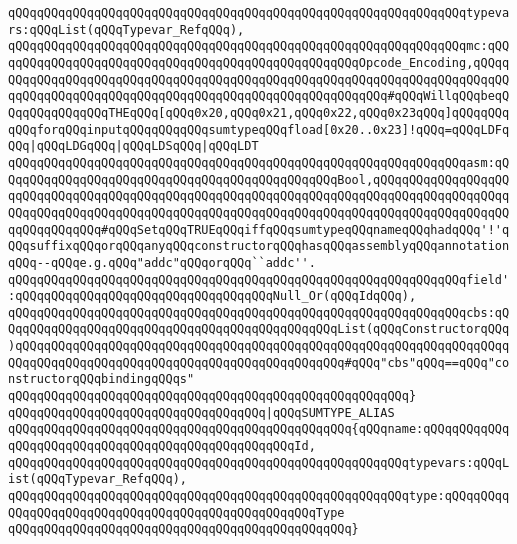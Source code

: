 \verb|qQQqqQQqqQQqqQQqqQQqqQQqqQQqqQQqqQQqqQQqqQQqqQQqqQQqqQQqqQQqqQQqtypevars:qQQqList(qQQqTypevar_RefqQQq),|\newline
\verb|qQQqqQQqqQQqqQQqqQQqqQQqqQQqqQQqqQQqqQQqqQQqqQQqqQQqqQQqqQQqqQQqmc:qQQqqQQqqQQqqQQqqQQqqQQqqQQqqQQqqQQqqQQqqQQqqQQqqQQqOpcode_Encoding,qQQqqQQqqQQqqQQqqQQqqQQqqQQqqQQqqQQqqQQqqQQqqQQqqQQqqQQqqQQqqQQqqQQqqQQqqQQqqQQqqQQqqQQqqQQqqQQqqQQqqQQqqQQqqQQqqQQqqQQqqQQqqQQq#qQQqWillqQQqbeqQQqqQQqqQQqqQQqTHEqQQq[qQQq0x20,qQQq0x21,qQQq0x22,qQQq0x23qQQq]qQQqqQQqqQQqforqQQqinputqQQqqQQqqQQqsumtypeqQQqfload[0x20..0x23]!qQQq=qQQqLDFqQQq|\verb#|qQQqLDGqQQq|qQQqLDSqQQq|qQQqLDT#\newline
\verb|qQQqqQQqqQQqqQQqqQQqqQQqqQQqqQQqqQQqqQQqqQQqqQQqqQQqqQQqqQQqqQQqasm:qQQqqQQqqQQqqQQqqQQqqQQqqQQqqQQqqQQqqQQqqQQqqQQqBool,qQQqqQQqqQQqqQQqqQQqqQQqqQQqqQQqqQQqqQQqqQQqqQQqqQQqqQQqqQQqqQQqqQQqqQQqqQQqqQQqqQQqqQQqqQQqqQQqqQQqqQQqqQQqqQQqqQQqqQQqqQQqqQQqqQQqqQQqqQQqqQQqqQQqqQQqqQQqqQQqqQQqqQQqqQQq#qQQqSetqQQqTRUEqQQqiffqQQqsumtypeqQQqnameqQQqhadqQQq'!'qQQqsuffixqQQqorqQQqanyqQQqconstructorqQQqhasqQQqassemblyqQQqannotationqQQq--qQQqe.g.qQQq"addc"qQQqorqQQq``addc''.|\newline
\verb|qQQqqQQqqQQqqQQqqQQqqQQqqQQqqQQqqQQqqQQqqQQqqQQqqQQqqQQqqQQqqQQqfield':qQQqqQQqqQQqqQQqqQQqqQQqqQQqqQQqqQQqNull_Or(qQQqIdqQQq),|\newline
\verb|qQQqqQQqqQQqqQQqqQQqqQQqqQQqqQQqqQQqqQQqqQQqqQQqqQQqqQQqqQQqqQQqcbs:qQQqqQQqqQQqqQQqqQQqqQQqqQQqqQQqqQQqqQQqqQQqqQQqList(qQQqConstructorqQQq)qQQqqQQqqQQqqQQqqQQqqQQqqQQqqQQqqQQqqQQqqQQqqQQqqQQqqQQqqQQqqQQqqQQqqQQqqQQqqQQqqQQqqQQqqQQqqQQqqQQqqQQqqQQqqQQqqQQq#qQQq"cbs"qQQq==qQQq"constructorqQQqbindingqQQqs"|\newline
\verb|qQQqqQQqqQQqqQQqqQQqqQQqqQQqqQQqqQQqqQQqqQQqqQQqqQQqqQQq}|\newline
\verb|qQQqqQQqqQQqqQQqqQQqqQQqqQQqqQQqqQQq|\verb#|qQQqSUMTYPE_ALIAS#\newline
\verb|qQQqqQQqqQQqqQQqqQQqqQQqqQQqqQQqqQQqqQQqqQQqqQQq{qQQqname:qQQqqQQqqQQqqQQqqQQqqQQqqQQqqQQqqQQqqQQqqQQqqQQqqQQqId,|\newline
\verb|qQQqqQQqqQQqqQQqqQQqqQQqqQQqqQQqqQQqqQQqqQQqqQQqqQQqqQQqtypevars:qQQqList(qQQqTypevar_RefqQQq),|\newline
\verb|qQQqqQQqqQQqqQQqqQQqqQQqqQQqqQQqqQQqqQQqqQQqqQQqqQQqqQQqtype:qQQqqQQqqQQqqQQqqQQqqQQqqQQqqQQqqQQqqQQqqQQqqQQqqQQqType|\newline
\verb|qQQqqQQqqQQqqQQqqQQqqQQqqQQqqQQqqQQqqQQqqQQqqQQq}|\newline
\newline
